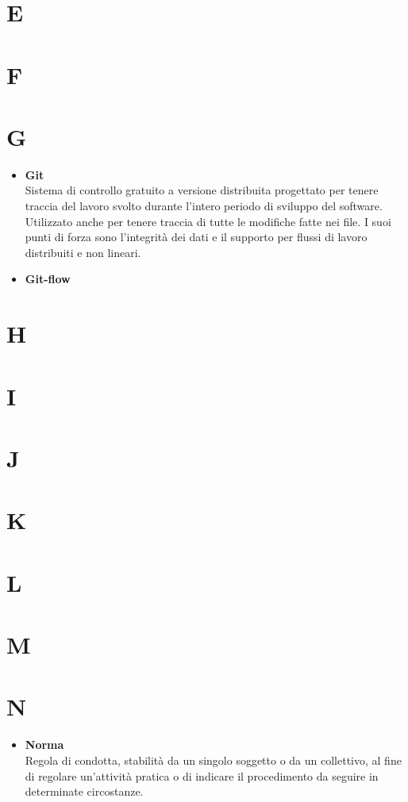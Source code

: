 \chapter{E}
\chapter{F}
\chapter{G}
	\begin{itemize}
		\item \textbf{Git}\\
		Sistema di controllo gratuito a versione distribuita progettato per tenere traccia del lavoro svolto durante l'intero periodo di sviluppo del software.
		Utilizzato anche per tenere traccia di tutte le modifiche fatte nei file.
		I suoi punti di forza sono l'integrità dei dati e il supporto per flussi di lavoro distribuiti e non lineari.
		\item \textbf{Git-flow}\\
	\end{itemize}
\chapter{H}
\chapter{I}
\chapter{J}
\chapter{K}
\chapter{L}
\chapter{M}
\chapter{N}
	\begin{itemize}
		\item \textbf{Norma}\\
		Regola di condotta, stabilità da un singolo soggetto o da un collettivo, al fine di regolare un'attività pratica o di indicare il procedimento da seguire in determinate circostanze.
	\end{itemize}

